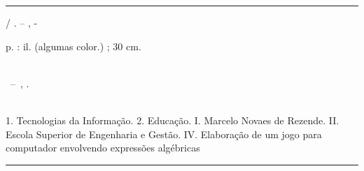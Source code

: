 \documentclass[
	12pt,				%
	openright,			%
	twoside,			%
	a4paper,			%
	english,			%
	french,				%
	spanish,			%
	brazil				%
	]{abntex2}
\begin{document}
\frenchspacing 


\imprimircapa

\imprimirfolhaderosto*


%
%     
\begin{fichacatalografica}
	\vspace*{\fill}					%
	\hrule							%
	\begin{center}					%
	\begin{minipage}[c]{12.5cm}		%
	
	\imprimirautor
	
	\hspace{0.5cm} \imprimirtitulo  / \imprimirautor. --
	\imprimirlocal, \imprimirdata-
	
	\hspace{0.5cm} \pageref{LastPage} p. : il. (algumas color.) ; 30 cm.\\
	
	\hspace{0.5cm} \imprimirorientadorRotulo~\imprimirorientador\\
	
	\hspace{0.5cm}
	\parbox[t]{\textwidth}{\imprimirtipotrabalho~--~\imprimirinstituicao,
	\imprimirdata.}\\
	\hspace{0.5cm}
		1. Tecnologias da Informação.
		2. Educação.
		I. Marcelo Novaes de Rezende.
		II. Escola Superior de Engenharia e Gestão.
		IV. Elaboração de um jogo para computador envolvendo expressões algébricas\\ 			
	
	\hspace{8.75cm}
	
	\end{minipage}
	\end{center}
	\hrule
\end{fichacatalografica}
\end{document}
